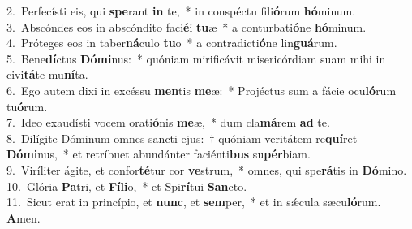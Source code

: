 {2.~}Perfecísti eis, qui \textbf{spe}rant \textbf{in} te,~* in conspéctu fili\textbf{ó}rum \textbf{hó}minum.\\
{3.~}Abscóndes eos in abscóndito faci\textbf{é}i \textbf{tu}æ~* a conturbati\textbf{ó}ne \textbf{hó}minum.\\
{4.~}Próteges eos in taber\textbf{ná}culo \textbf{tu}o~* a contradicti\textbf{ó}ne lin\textbf{guá}rum.\\
{5.~}Bene\textbf{dí}ctus \textbf{Dó}\textbf{mi}nus:~* quóniam mirificávit misericórdiam suam mihi in civi\textbf{tá}te mu\textbf{ní}ta.\\
{6.~}Ego autem dixi in excéssu \textbf{men}tis \textbf{me}æ:~* Projéctus sum a fácie ocu\textbf{ló}rum tu\textbf{ó}rum.\\
{7.~}Ideo exaudísti vocem orati\textbf{ó}nis \textbf{me}æ,~* dum cla\textbf{má}rem \textbf{ad} te.\\
{8.~}Dilígite Dóminum omnes sancti ejus:~† quóniam veritátem re\textbf{quí}ret \textbf{Dó}\textbf{mi}nus,~* et retríbuet abundánter faciénti\textbf{bus} su\textbf{pér}biam.\\
{9.~}Viríliter ágite, et confor\textbf{té}tur cor \textbf{ve}strum,~* omnes, qui spe\textbf{rá}tis in \textbf{Dó}mino.\\
{10.~}Glória \textbf{Pa}tri, et \textbf{Fí}\textbf{li}o,~* et Spi\textbf{rí}tui \textbf{San}cto.\\
{11.~}Sicut erat in princípio, et \textbf{nunc}, et \textbf{sem}per,~* et in sǽcula sæcu\textbf{ló}rum. \textbf{A}men.\\
